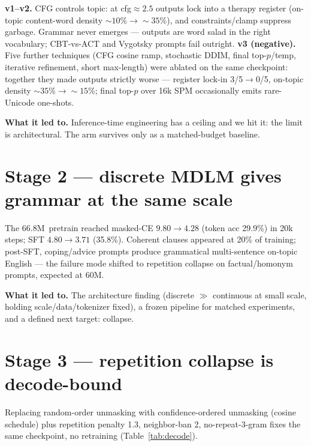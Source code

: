 \documentclass[11pt]{article}
\newcommand{\sixsix}{66.8M}
\begin{document}
\textbf{v1--v2.} CFG controls topic: at cfg${\approx}2.5$ outputs lock into a therapy register (on-topic content-word density ${\sim}10\%\!\to\!{\sim}35\%$), and constraints/clamp suppress garbage. Grammar never emerges --- outputs are word salad in the right vocabulary; CBT-vs-ACT and Vygotsky prompts fail outright. \textbf{v3 (negative).} Five further techniques (CFG cosine ramp, stochastic DDIM, final top-$p$/temp, iterative refinement, short max-length) were ablated on the same checkpoint: together they made outputs strictly worse --- register lock-in 3/5$\to$0/5, on-topic density ${\sim}35\%\!\to\!{\sim}15\%$; final top-$p$ over 16k SPM occasionally emits rare-Unicode one-shots.

\textbf{What it led to.} Inference-time engineering has a ceiling and we hit it: the limit is architectural. The arm survives only as a matched-budget baseline.

\section{Stage 2 --- discrete MDLM gives grammar at the same scale}\label{sec:mdlm}

The \sixsix\ pretrain reached masked-CE $9.80\!\to\!4.28$ (token acc 29.9\%) in 20k steps; SFT $4.80\!\to\!3.71$ (35.8\%). Coherent clauses appeared at 20\% of training; post-SFT, coping/advice prompts produce grammatical multi-sentence on-topic English --- the failure mode shifted to repetition collapse on factual/homonym prompts, expected at 60M.

\textbf{What it led to.} The architecture finding (discrete $\gg$ continuous at small scale, holding scale/data/tokenizer fixed), a frozen pipeline for matched experiments, and a defined next target: collapse.

\section{Stage 3 --- repetition collapse is decode-bound}\label{sec:decode}

Replacing random-order unmasking with confidence-ordered unmasking (cosine schedule) plus repetition penalty 1.3, neighbor-ban 2, no-repeat-3-gram fixes the same checkpoint, no retraining (Table~\ref{tab:decode}).
\end{document}
